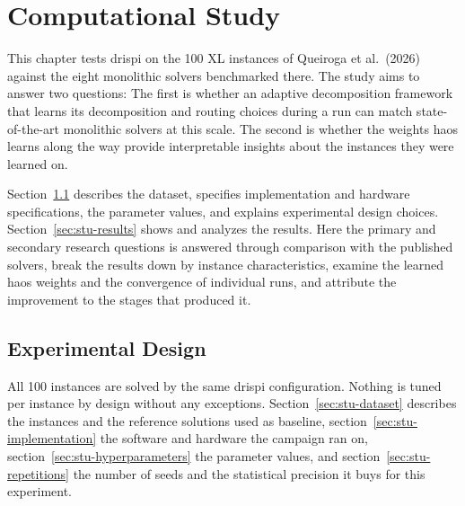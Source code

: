 \chapter{Computational Study}\label{chapter:study}
This chapter tests \gls{drispi} on the 100 XL instances of Queiroga et al.\ (2026)
against the eight monolithic solvers benchmarked there. The study aims to answer two questions:
The first is whether an adaptive decomposition framework that learns its
decomposition and routing choices during a run can match state-of-the-art
monolithic solvers at this scale. The second is whether the weights \gls{haos} learns along the way provide interpretable 
insights about the instances they were learned on.

Section~\ref{sec:stu-experiment} describes the dataset, specifies implementation and
hardware specifications, the parameter values, and explains experimental design choices. Section~\ref{sec:stu-results} shows and analyzes the results. Here the primary and secondary research questions is answered through comparison with the published solvers, break the results down by instance characteristics, examine the learned \gls{haos} weights and the convergence of individual runs, and attribute the improvement to the stages that produced it.

\section{Experimental Design}\label{sec:stu-experiment}
All 100 instances are solved by the same \gls{drispi} configuration. Nothing is tuned
per instance by design without any exceptions. Section~\ref{sec:stu-dataset} describes the instances and the reference solutions used as baseline, section~\ref{sec:stu-implementation} the software and hardware the campaign
ran on, section~\ref{sec:stu-hyperparameters} the parameter values, and
section~\ref{sec:stu-repetitions} the number of seeds and the statistical precision it buys for this experiment.

